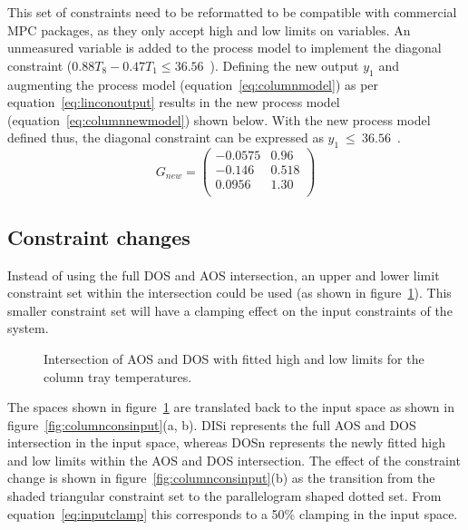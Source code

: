 \documentclass[final,authoryear,5pt,times,twocolumn]{elsarticle}
\newcommand{\bpm}{\begin{pmatrix}} %
\newcommand{\epm}{\end{pmatrix}}
\begin{document}
This set of constraints need to be reformatted to be compatible with commercial MPC packages, as they only accept high and low limits on variables.
An unmeasured variable is added to the process model to implement the diagonal constraint ($0.88T_8-0.47T_1\leq 36.56$~\textcelsius).
Defining the new output $y_1$ and augmenting the process model (equation~\ref{eq:columnmodel}) as per equation~\ref{eq:linconoutput} results in the new process model (equation~\ref{eq:columnnewmodel}) shown below. With the new process model defined thus, the diagonal constraint can be expressed as {$y_1~\leq~36.56$~\textcelsius}.
\begin{equation}
  \label{eq:columnnewmodel}
  G_{new}= \bpm -0.0575 & 0.96 \\       %
                  -0.146  & 0.518 \\      %
                   0.0956 & 1.30 \\ \epm  %
\end{equation}


\subsection{Constraint changes}
Instead of using the full DOS and AOS intersection, an upper and lower limit constraint set within the intersection could be used (as shown in figure~\ref{fig:columnfitbox}).
This smaller constraint set will have a clamping effect on the input constraints of the system.

\begin{figure}[htbp]
  \centering
    \scalebox{1}{}
    \endpgfgraphicnamed
  \caption[Fitted constraints for the laboratory distillation column]{Intersection of AOS and DOS with fitted high and low limits for the column tray temperatures.}
  \label{fig:columnfitbox}
\end{figure}

The spaces shown in figure~\ref{fig:columnfitbox} are translated back to the input space as shown in figure~\ref{fig:columnconsinput}(a, b).
DISi represents the full AOS and DOS intersection in the input space, whereas DOSn represents the newly fitted high and low limits within the AOS and DOS intersection.
The effect of the constraint change is shown in figure~\ref{fig:columnconsinput}(b) as the transition from the shaded triangular constraint set to the parallelogram shaped dotted set.
From equation~\ref{eq:inputclamp} this corresponds to a 50\% clamping in the input space.
\end{document}
